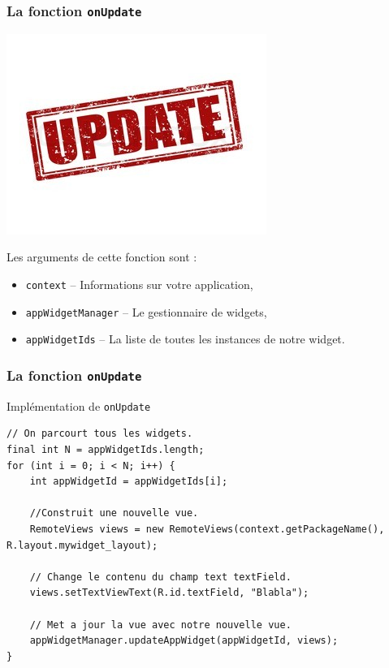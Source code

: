 \documentclass{beamer}
\begin{document}
\begin{frame}[fragile]
\frametitle{La fonction \verb!onUpdate!}
\begin{center}
\includegraphics[scale=1]{update.jpg}
\end{center}
\begin{block}{Les arguments de cette fonction sont :}
\begin{itemize}
\item[] {\color{blue} \verb!context!} -- Informations sur votre application,
\item[] {\color{blue} \verb!appWidgetManager!} -- Le gestionnaire de widgets,
\item[] {\color{blue} \verb!appWidgetIds!} -- La liste de toutes les instances de notre widget.
\end{itemize}
\end{block}
\end{frame}

\begin{frame}[fragile]
\frametitle{La fonction \verb!onUpdate!}
\begin{block}{Implémentation de \verb!onUpdate!}
\lstset{language=java}
\begin{lstlisting}
// On parcourt tous les widgets.
final int N = appWidgetIds.length;
for (int i = 0; i < N; i++) {
    int appWidgetId = appWidgetIds[i];

    //Construit une nouvelle vue.
    RemoteViews views = new RemoteViews(context.getPackageName(), R.layout.mywidget_layout);

    // Change le contenu du champ text textField.
    views.setTextViewText(R.id.textField, "Blabla");

    // Met a jour la vue avec notre nouvelle vue.
    appWidgetManager.updateAppWidget(appWidgetId, views);
}
\end{lstlisting}
\end{block}
\end{frame}
\end{document}
